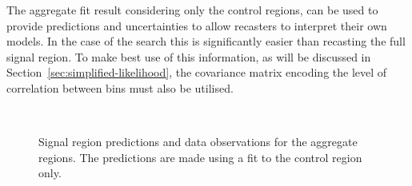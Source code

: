 The aggregate fit result considering only the control regions, 
can be used to provide predictions and uncertainties
to allow recasters to interpret their own models. In the case of the \alphat search
this is significantly easier than recasting the full signal region. To make best use of this information, 
as will be discussed in Section~\ref{sec:simplified-likelihood}, 
the covariance matrix encoding the level of correlation between bins must also be utilised.
\clearpage
\begin{figure}[!tbhp]
    \caption{ Signal region predictions and data observations for the aggregate regions. 
    The predictions are made using a fit to the control region only. \label{fig:aggFitResult} }
  \begin{center}
     ~~
     \\

\end{center}
\end{figure}
